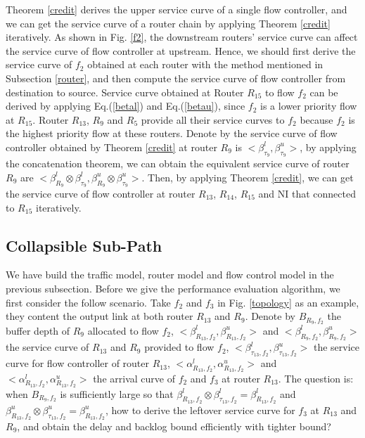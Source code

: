 \documentclass[10pt,journal]{IEEEtran}
\begin{document}
Theorem \ref{credit} derives the upper service curve of a single flow controller, and we can get the service curve of a router chain by applying Theorem
\ref{credit} iteratively. As shown in Fig. \ref{f2}, the downstream routers' service curve can affect the service curve of flow controller at upstream. Hence, we should first derive the service curve of $f_2$ obtained at each router with the method mentioned in Subsection \ref{router}, and then compute the service curve of flow controller from destination to source. Service curve obtained at Router $R_{15}$ to flow $f_2$ can be derived by applying Eq.(\ref{betal}) and Eq.(\ref{betau}), since $f_2$ is a lower priority flow at $R_{15}$. Router $R_{13}$, $R_{9}$ and $R_{5}$ provide all their service curves to $f_2$ because $f_2$ is the highest priority flow at these routers. Denote by the service curve of flow controller obtained by Theorem \ref{credit} at router $R_{9}$ is $<\beta_{\tau_9}^l,\beta_{\tau_9}^u>$, by applying the concatenation theorem, we can obtain the equivalent service curve of router $R_{9}$ are $<\beta_{R_9}^l\otimes\beta_{\tau_9}^l,\beta_{R_9}^u\otimes\beta_{\tau_9}^u>$. Then, by applying Theorem \ref{credit}, we can get the service curve of flow controller at router $R_{13}$, $R_{14}$, $R_{15}$ and NI that connected to $R_{15}$ iteratively.

\subsection{Collapsible Sub-Path}
We have build the traffic model, router model and flow control model in the previous subsection. Before we give the performance evaluation algorithm, we first consider the follow scenario. Take $f_2$ and $f_3$ in Fig. \ref{topology} as an example, they content the output link at both router $R_{13}$ and $R_{9}$. Denote by $B_{R_9,f_2}$ the buffer depth of $R_{9}$ allocated to flow $f_2$, $<\beta_{R_{13},f_2}^l,\beta_{R_{13},f_2}^u>$ and $<\beta_{R_{9},f_2}^l,\beta_{R_{9},f_2}^u>$ the service curve of $R_{13}$ and $R_{9}$ provided to flow $f_2$, $<\beta_{\tau_{13},f_2}^l,\beta_{\tau_{13},f_2}^u>$ the service curve for flow controller of router $R_{13}$, $<\alpha_{R_{13},f_2}^l,\alpha_{R_{13},f_2}^u>$ and $<\alpha_{R_{13},f_2}^l,\alpha_{R_{13},f_2}^u>$ the arrival curve of $f_2$ and $f_3$ at router $R_{13}$. The question is: when $B_{R_9,f_2}$ is sufficiently large so that $\beta_{R_{13},f_2}^l\otimes\beta_{\tau_{13},f_2}^l=\beta_{R_{13},f_2}^l$ and $\beta_{R_{13},f_2}^u\otimes\beta_{\tau_{13},f_2}^u=\beta_{R_{13},f_2}^u$, how to derive the leftover service curve for $f_3$ at $R_{13}$ and $R_9$, and obtain the delay and backlog bound efficiently with tighter bound?
\end{document}
